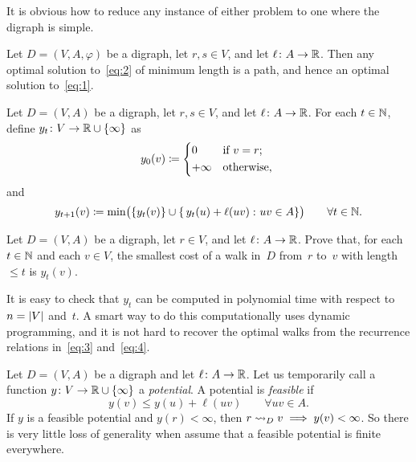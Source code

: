 \documentclass[10pt,reqno]{amsart}
\begin{document}
It is obvious how to reduce any instance of either problem to one
where the digraph is simple.

\begin{proposition}
  Let \(D = (V,A,\varphi)\) be a digraph, let \(r,s \in V\), and let
  \(\ell \colon A \to \mathbb{R}\).  Then any optimal solution
  to~\eqref{eq:2} of minimum length is a path, and hence an optimal
  solution to~\eqref{eq:1}.
\end{proposition}

Let \(D = (V,A)\) be a digraph, let \(r,s \in V\), and let
\(\ell \colon A \to \mathbb{R}\).  For each \(t \in \mathbb{N}\), define
\(y_t \colon V \to \mathbb{R} \cup \{\infty\}\) as
\begin{equation}
  \label{eq:3}
  y_0(v)
  \coloneqq
  \begin{cases*}
    0       & if \(v = r\); \\
    +\infty & otherwise,    \\
  \end{cases*}
\end{equation}
and
\begin{equation}
  \label{eq:4}
  y_{t+1}(v)
  \coloneqq
  \min\paren[\big]{
    \set{y_t(v)}
    \cup
    \setst{
      y_t(u) + \ell(uv)
    }{
      uv \in A
    }}
  \qquad
  \forall t \in \Naturals.
\end{equation}

\begin{exercise}
  Let \(D = (V,A)\) be a digraph, let \(r \in V\), and let
  \(\ell \colon A \to \mathbb{R}\).  Prove that, for each
  \(t \in \mathbb{N}\) and each \(v \in V\), the smallest cost of a
  walk in~\(D\) from~\(r\) to~\(v\) with length \(\leq t\) is
  \(y_t(v)\).
\end{exercise}

It is easy to check that \(y_t\) can be computed in polynomial time
with respect to \(n = \lvert V\rvert\) and~\(t\).  A smart way to do this
computationally uses dynamic programming, and it is not hard to
recover the optimal walks from the recurrence relations
in~\eqref{eq:3} and~\eqref{eq:4}.

Let \(D = (V,A)\) be a digraph and let \(\ell \colon A \to \mathbb{R}\).
Let us temporarily call a function
\(y \colon V \to \mathbb{R} \cup \{\infty\}\) a \emph{potential}.  A
potential is \emph{feasible} if
\begin{equation*}
  y(v) \leq y(u) + \ell(uv)
  \qquad
  \forall uv \in A.
\end{equation*}
If \(y\) is a feasible potential and \(y(r) < \infty\), then
\(r \rightsquigarrow_D v \implies y(v) < \infty\).  So there is very little
loss of generality when assume that a feasible potential is finite
everywhere.
\end{document}
